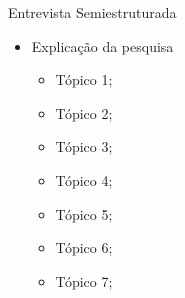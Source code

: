 \Large Entrevista Semiestruturada 
\normalsize
\begin{itemize}
    \item Explicação da pesquisa
    \begin{itemize}
        \item Tópico 1;
        \item Tópico 2;
        \item Tópico 3;
        \item Tópico 4;
        \item Tópico 5;
        \item Tópico 6;
        \item Tópico 7;
    \end{itemize}
\end{itemize}
